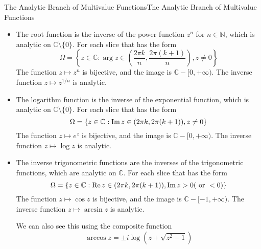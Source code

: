 \documentclass[../main.tex]{subfiles}
\begin{document}
\begin{proposition}{The Analytic Branch of Multivalue Functions}{The Analytic Branch of Multivalue Functions}
\begin{itemize}
	\item The root function is the inverse of the power function $z^n$ for $n\in\mathbb{N}$, which is analytic on $\mathbb{C}\setminus\{0\}$. For each slice that has the form
		\begin{equation*}
		\Omega = \left\{ z\in \mathbb{C}: \arg z\in ( \frac{2 \pi k}{n}, \frac{2 \pi (k+1)}{n}), z\neq 0 \right\}
		\end{equation*}
		The function $z \mapsto z^n$ is bijective, and the image is $\mathbb{C} - [0,+\infty )$. The inverse function $z \mapsto z^{1/n}$ is analytic.
	\item The logarithm function is the inverse of the exponential function, which is analytic on $\mathbb{C}\setminus\{0\}$. For each slice that has the form
		\begin{equation*}
		\Omega = \left\{ z\in \mathbb{C}: \operatorname{Im} z\in (2 \pi k, 2 \pi (k+1)), z\neq 0 \right\}
		\end{equation*}
		The function $z \mapsto e^z$ is bijective, and the image is $\mathbb{C} - [0,+\infty )$. The inverse function $z \mapsto \log z$ is analytic.
	\item The inverse trigonometric functions are the inverses of the trigonometric functions, which are analytic on $\mathbb{C}$. For each slice that has the form
		\begin{equation*}
		\Omega = \left\{ z\in \mathbb{C}: \operatorname{Re} z\in (2 \pi k, 2 \pi (k+1)), \operatorname{Im} z>0 (\text{ or } <0) \right\}
		\end{equation*}
		The function $z \mapsto \cos z$ is bijective, and the image is $\mathbb{C} - [-1,+\infty )$. The inverse function $z \mapsto \arcsin z$ is analytic.

		We can also see this using the composite function
		\begin{equation*}
			\arccos z = \pm i \log \left( z + \sqrt{z^2-1} \right)
		\end{equation*}
\end{itemize}
\end{proposition}
\end{document}
